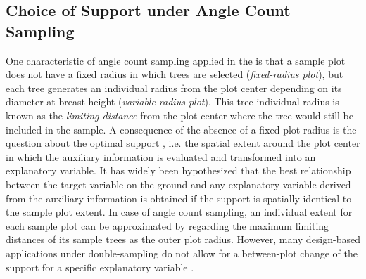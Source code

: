\subsection{Choice of Support under Angle Count Sampling}
\label{sec:supp}

One characteristic of angle count sampling applied in the \bwi{} is that a sample plot does not have a fixed radius in which trees are selected (\textit{fixed-radius plot}), but each tree generates an individual radius from the plot center depending on its diameter at breast height (\textit{variable-radius plot}). This tree-individual radius is known as the \textit{limiting distance} from the plot center where the tree would still be included in the sample. A consequence of the absence of a fixed plot radius is the question about the optimal support \citep{hollaus2007}, i.e. the spatial extent around the plot center in which the auxiliary information is evaluated and transformed into an explanatory variable. It has widely been hypothesized that the best relationship between the target variable on the ground and any explanatory variable derived from the auxiliary information is obtained if the support is spatially identical to the sample plot extent. In case of angle count sampling, an individual extent for each sample plot can be approximated by regarding the maximum limiting distances of its sample trees as the outer plot radius. However, many design-based applications under double-sampling do not allow for a between-plot change of the support for a specific explanatory variable \citep{mandallaz2013c, mandallaz2013a}.\par
